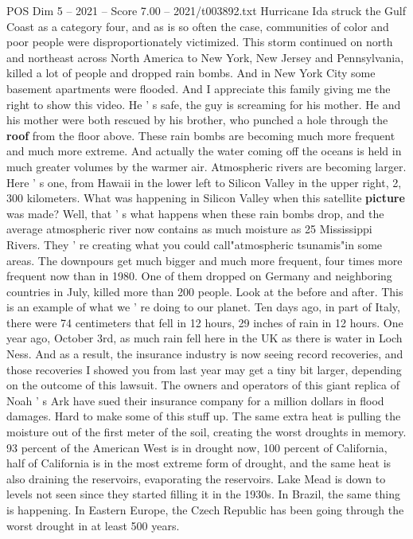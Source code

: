 \begin{textsample}{POS Dim 5 – 2021 – Score 7.00 – 2021/t003892.txt}
Hurricane Ida struck the Gulf Coast as a category four, and as is so often the case, communities of color and poor people were disproportionately victimized.
This storm continued on north and northeast across North America to New York, New Jersey and Pennsylvania, killed a lot of people and dropped rain bombs.
And in New York City some basement apartments were flooded.
And I appreciate this family giving me the right to show this video.
He ' s safe, the guy is screaming for his mother.
He and his mother were both rescued by his brother, who punched a hole through the \textbf{roof} from the floor above.
These rain bombs are becoming much more frequent and much more extreme.
And actually the water coming off the oceans is held in much greater volumes by the warmer air.
Atmospheric rivers are becoming larger.
Here ' s one, from Hawaii in the lower left to Silicon Valley in the upper right, 2, 300 kilometers.
What was happening in Silicon Valley when this satellite \textbf{picture} was made?
Well, that ' s what happens when these rain bombs drop, and the average atmospheric river now contains as much moisture as 25 Mississippi Rivers.
They ' re creating what you could call"atmospheric tsunamis"in some areas.
The downpours get much bigger and much more frequent, four times more frequent now than in 1980.
One of them dropped on Germany and neighboring countries in July, killed more than 200 people.
Look at the before and after.
This is an example of what we ' re doing to our planet.
Ten days ago, in part of Italy, there were 74 centimeters that fell in 12 hours, 29 inches of rain in 12 hours.
One year ago, October 3rd, as much rain fell here in the UK as there is water in Loch Ness.
And as a result, the insurance industry is now seeing record recoveries, and those recoveries I showed you from last year may get a tiny bit larger, depending on the outcome of this lawsuit.
The owners and operators of this giant replica of Noah ' s Ark have sued their insurance company for a million dollars in flood damages.
Hard to make some of this stuff up.
The same extra heat is pulling the moisture out of the first meter of the soil, creating the worst droughts in memory. 93 percent of the American West is in drought now, 100 percent of California, half of California is in the most extreme form of drought, and the same heat is also draining the reservoirs, evaporating the reservoirs.
Lake Mead is down to levels not seen since they started filling it in the 1930s.
In Brazil, the same thing is happening.
In Eastern Europe, the Czech Republic has been going through the worst drought in at least 500 years.

\end{textsample}
